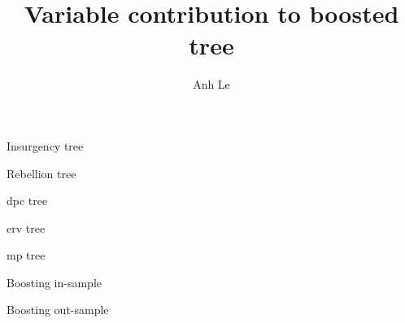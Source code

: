 \documentclass[]{article}
\title{Variable contribution to boosted tree}
\author{Anh Le}
\begin{document}
\maketitle

\begin{table}
\centering
	
	\caption{Insurgency tree}
\end{table}

\begin{table}
\centering
	
	\caption{Rebellion tree}
\end{table}

\begin{table}
\centering
	
	\caption{dpc tree}
\end{table}

\begin{table}
\centering
	
	\caption{erv tree}
\end{table}

\begin{table}
\centering
	
	\caption{mp tree}
\end{table}

\begin{table}
\centering
	
	\caption{Boosting in-sample}
\end{table}

\begin{table}
\centering
	
	\caption{Boosting out-sample}
\end{table}
\end{document}
